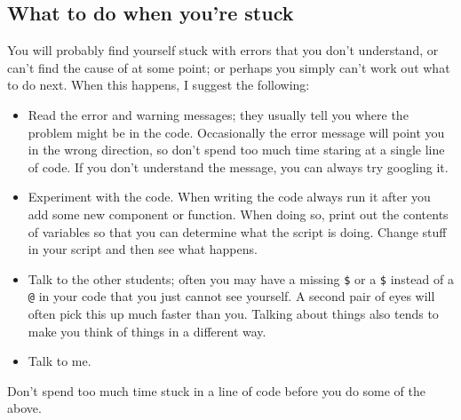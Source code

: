 \documentclass[11pt]{article}
\begin{document}
\subsection{What to do when you're stuck}
You will probably find yourself stuck with errors that you don't understand,
or can't find the cause of at some point; or perhaps you simply can't work out
what to do next. When this happens, I suggest the following:
\begin{itemize}
\item Read the error and warning messages; they usually tell you where the
  problem might be in the code. Occasionally the error message will point you
  in the wrong direction, so don't spend too much time staring at a single
  line of code. If you don't understand the message, you can always try
  googling it.
\item Experiment with the code. When writing the code always run it after you add
  some new component or function. When doing so, print out the contents of variables so
  that you can determine what the script is doing. Change stuff in your script
  and then see what happens.
\item Talk to the other students; often you may have a missing \verb|$| or a
  \verb|$| instead of a \verb|@| in your code that you just cannot see
  yourself. A second pair of eyes will often pick this up much faster than
  you. Talking about things also tends to make you think of things in a
  different way.
\item Talk to me.
\end{itemize}

Don't spend too much time stuck in a line of code before you do some of the above.
\end{document}
